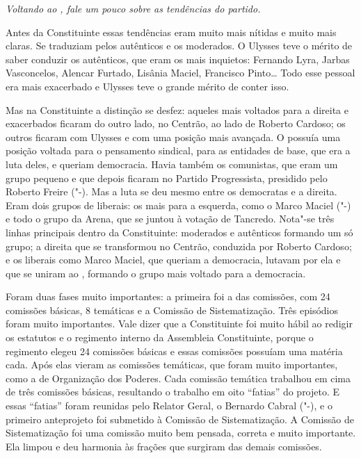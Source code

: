\medskip

\noindent\emph{Voltando ao , fale um pouco sobre as tendências do partido.}

Antes da Constituinte essas tendências eram muito mais
nítidas e muito mais claras. Se traduziam pelos autênticos e os
moderados. O Ulysses teve o mérito de saber conduzir os autênticos, que
eram os mais inquietos: Fernando Lyra, Jarbas Vasconcelos, Alencar
Furtado, Lisânia Maciel, Francisco Pinto\ldots{} Todo esse pessoal era mais
exacerbado e Ulysses teve o grande mérito de conter isso.

Mas na Constituinte a distinção se desfez: aqueles mais voltados para a
direita e exacerbados ficaram do outro lado, no Centrão, ao lado de
Roberto Cardoso; os outros ficaram com Ulysses e com uma posição mais
avançada. O  possuía uma posição voltada para o pensamento sindical,
para as entidades de base, que era a luta deles, e queriam democracia.
Havia também os comunistas, que eram um grupo pequeno e que depois
ficaram no Partido Progressista, presidido pelo Roberto Freire ("-).
Mas a luta se deu mesmo entre os democratas e a direita. Eram dois
grupos de liberais: os mais para a esquerda, como o Marco Maciel
("-) e todo o grupo da Arena, que se juntou à votação de Tancredo.
Nota"-se três linhas principais dentro da Constituinte: moderados e
autênticos formando um só grupo; a direita que se transformou no
Centrão, conduzida por Roberto Cardoso; e os liberais como Marco Maciel,
que queriam a democracia, lutavam por ela e que se uniram ao ,
formando o grupo mais voltado para a democracia.

Foram duas fases muito importantes: a primeira foi a das comissões, com
24 comissões básicas, 8 temáticas e a Comissão de Sistematização. Três
episódios foram muito importantes. Vale dizer que a Constituinte foi
muito hábil ao redigir os estatutos e o regimento interno da Assembleia
Constituinte, porque o regimento elegeu 24 comissões básicas e essas
comissões possuíam uma matéria cada. Após elas vieram as comissões
temáticas, que foram muito importantes, como a de Organização dos
Poderes. Cada comissão temática trabalhou em cima de três comissões
básicas, resultando o trabalho em oito ``fatias'' do projeto. E essas
``fatias'' foram reunidas pelo Relator Geral, o Bernardo Cabral
("-), e o primeiro anteprojeto foi submetido à Comissão de
Sistematização. A Comissão de Sistematização foi uma comissão muito bem
pensada, correta e muito importante. Ela limpou e deu harmonia às
frações que surgiram das demais comissões.

